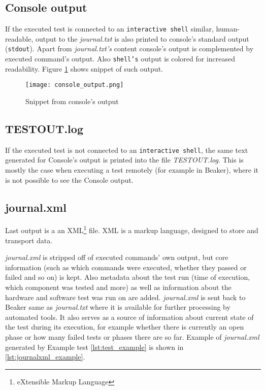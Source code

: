 \subsection{Console output}
\label{console_out}
If the executed test is connected to an \texttt{interactive shell} similar, human-readable, output to the \textit{journal.txt} is also printed to console's standard output (\texttt{stdout}). Apart from  \textit{journal.txt's} content console's output is complemented by executed command's output. Also \texttt{shell's} output is colored for increased readability.  Figure \ref{fig:console_output} shows snippet of such output.

\begin{figure}
  \texttt{[image: console\_output.png]}
  \caption{Snippet from console's output}
  \label{fig:console_output}
\end{figure}

\subsection{TESTOUT.log}
If the executed test is not connected to an \texttt{interactive shell}, the same text generated for Console's output is printed into the file \textit{TESTOUT.log}. This is mostly the case when executing a test remotely (for example in Beaker), where it is not possible to see the Console output.

\subsection{journal.xml}
Last output is a an XML\footnote{eXtensible Markup Language} file. XML is a markup language, designed to store and transport data.\cite{xml_intro} 

\textit{journal.xml} is stripped off of executed commands' own output, but core information (such as which commands were executed, whether they passed or failed and so on) is kept. Also metadata about the test run (time of execution, which component was tested and more) as well as information about the hardware and software test was run on are added. \textit{journal.xml} is sent back to Beaker same as \textit{journal.txt} where it is available for further processing by automated tools. It also serves as a source of information about current state of the test during its execution, for example whether there is currently an open phase or how many failed tests or phases there are so far. Example of \textit{journal.xml} generated by Example test \ref{lst:test_example} is shown in \ref{lst:journalxml_example}.

